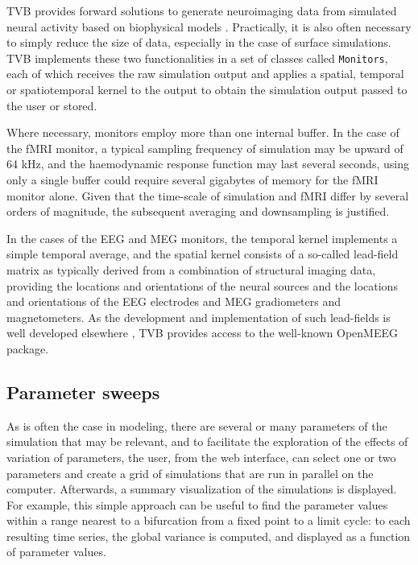 \documentclass{bioinfo}
\begin{document}
TVB provides forward solutions to generate neuroimaging data from 
simulated neural activity based on biophysical models 
\citep{Buxton_2004, Jirsa_2002}. Practically, it is also often
necessary to simply reduce the size of data, especially in the case of 
surface simulations. TVB implements these two functionalities in
a set of classes called \texttt{Monitors}, each of which receives
the raw simulation output and applies a spatial, temporal or spatiotemporal
kernel to the output to obtain the simulation output passed to the
user or stored. 

Where necessary, monitors employ more than one internal buffer. In the case of 
the fMRI monitor, a typical sampling frequency of simulation may be upward of 
64 kHz, and the haemodynamic response function may last several seconds, 
using only a single buffer could require several gigabytes of memory for the 
fMRI monitor alone. Given that 
the time-scale of simulation and fMRI differ by several orders of magnitude, 
the subsequent averaging and downsampling is justified. 

In the cases of the EEG and MEG monitors, the temporal kernel implements a
simple temporal average, and the spatial kernel consists of a so-called
lead-field matrix as typically derived from a combination of structural imaging
data, providing the locations and orientations of the neural sources and the
locations and orientations of the EEG electrodes and MEG gradiometers and
magnetometers.  As the development and implementation of such lead-fields is
well developed elsewhere
\citep{Sarvas_1987,Hamalainen_1989,Jirsa_2002,Nolte2003,Gramfort_2010}, TVB
provides access to the well-known OpenMEEG package.

\subsection{Parameter sweeps}

As is often the case in modeling, there are several or many parameters of the
simulation that may be relevant, and to facilitate the exploration of the effects
of variation of parameters, the user, from the web interface, can select one or
two parameters and create a grid of simulations that are run in parallel on the
computer. Afterwards, a summary visualization of the simulations is displayed. For
example, this simple approach can be useful to find the parameter
values within a range nearest to a bifurcation from a fixed point to a limit
cycle: to each resulting time series, the global variance is computed, and 
displayed as a function of parameter values. 
\end{document}
